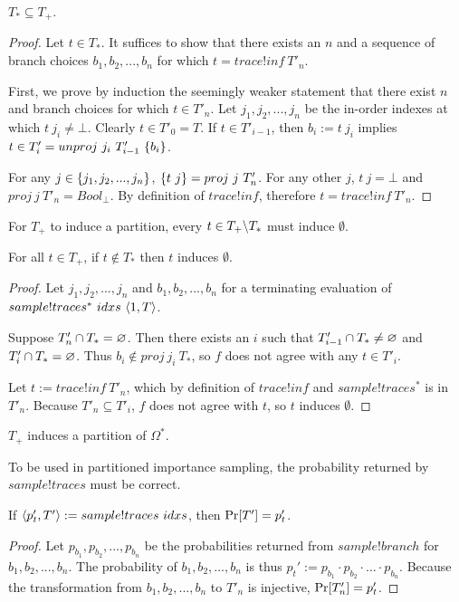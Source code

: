 \begin{theorem}
$T_* \subseteq T_+$.
\end{theorem}
\begin{proof}
Let $t \in T_*$.
It suffices to show that there exists an $n$ and a sequence of branch choices $b_1,b_2,...,b_n$ for which $t = trace!inf~T'_n$.

First, we prove by induction the seemingly weaker statement that there exist $n$ and branch choices for which $t \in T'_n$.
Let $j_1,j_2,...,j_n$ be the in-order indexes at which $t~j_i \neq \bot$.
Clearly $t \in T'_0 = T$.
If $t \in T'_{i-1}$, then $b_i := t~j_i$ implies $t \in T'_i = unproj~j_i~T'_{i-1}~\{{b_i}\}$.

For any $j \in \{{j_1,j_2,...,j_n}\}$, $\{{t~j}\} = proj~j~T'_n$.
For any other $j$, $t~j = \bot$ and $proj~j~T'_n = Bool_\bot$.
By definition of $trace!inf$, therefore $t = trace!inf~T'_n$.
\end{proof}

For $T_+$ to induce a partition, every $t \in T_+ \backslash T_*$ must induce $\emptyset$.

\begin{theorem}
For all $t \in T_+$, if $t \notin T_*$ then $t$ induces $\emptyset$.
\end{theorem}
\begin{proof}
Let $j_1,j_2,...,j_n$ and $b_1,b_2,...,b_n$ for a terminating evaluation of $sample!traces^*~idxs~\langle{1,T}\rangle$.

Suppose $T'_n \cap T_* = \varnothing$.
Then there exists an $i$ such that $T'_{i-1} \cap T_* \neq \varnothing$ and $T'_i \cap T_* = \varnothing$.
Thus $b_i \notin proj~j_i~T_*$, so $f$ does not agree with any $t \in T'_i$.

Let $t := trace!inf~T'_n$, which by definition of $trace!inf$ and $sample!traces^*$ is in $T'_n$.
Because $T'_n \subseteq T'_i$, $f$ does not agree with $t$, so $t$ induces $\emptyset$.
\end{proof}

\begin{corollary}
$T_+$ induces a partition of $\Omega^*$.
\end{corollary}


To be used in partitioned importance sampling, the probability returned by $sample!traces$ must be correct.

\begin{theorem}
If $\langle{p_t',T'}\rangle := sample!traces~idxs$, then $\mathrm{Pr}\!\left[{T'}\right] = p_t'$.
\end{theorem}
\begin{proof}
Let $p_{b_1},p_{b_2},...,p_{b_n}$ be the probabilities returned from $sample!branch$ for $b_1,b_2,...,b_n$.
The probability of $b_1,b_2,...,b_n$ is thus $p_t' := p_{b_1} \cdot p_{b_2} \cdot ... \cdot p_{b_n}$.
Because the transformation from $b_1,b_2,...,b_n$ to $T'_n$ is injective, $\mathrm{Pr}\!\left[{T'_n}\right] = p_t'$.
\end{proof}

